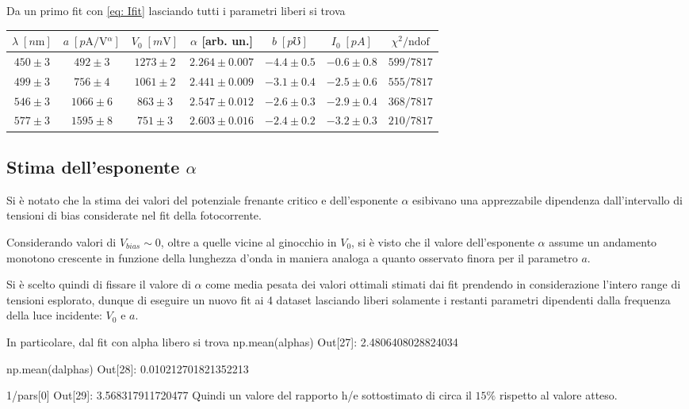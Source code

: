 \documentclass[10pt, a4paper, italian]{article}
\begin{document}
Da un primo fit con \cref{eq: Ifit} lasciando tutti i parametri liberi si
trova
\begin{table}
\centering
\begin{tabular}{ccccccc}
\toprule
$\lambda \; [\si{n\m}]$ & $a \; [\si{p\A/\V^\alpha}] $ & $V_0 \; [\si{m\V}]$ &
$\alpha$ [arb. un.] & $b \; [\si{p\mho}]$ & $I_0 \; [\si{pA}]$ & $\chi^2/\text{ndof}$ \\
\midrule
$450 \pm 3$ & $492 \pm 3$ & $1273 \pm 2$ & $2.264 \pm 0.007$ & $-4.4 \pm 0.5$ &
$-0.6 \pm 0.8$ & $599/7817$ \\
$499 \pm 3$ & $756 \pm 4$ & $1061 \pm 2$ & $2.441 \pm 0.009$ & $-3.1 \pm 0.4$ &
$-2.5 \pm 0.6$ & $555/7817$ \\
$546 \pm 3$ & $1066 \pm 6$ & $863 \pm 3$ & $2.547 \pm 0.012$ & $-2.6 \pm 0.3$ &
$-2.9 \pm 0.4$ & $368/7817$ \\
$577 \pm 3$ & $1595 \pm 8$ & $751 \pm 3$ & $2.603 \pm 0.016$ & $-2.4 \pm 0.2$ &
$-3.2 \pm 0.3$ & $210/7817$ \\
\bottomrule
\end{tabular}
\end{table}

\subsection{Stima dell'esponente $\alpha$}
Si è notato che la stima dei valori del potenziale frenante critico e
dell'esponente $\alpha$ esibivano una apprezzabile dipendenza dall'intervallo
di tensioni di bias considerate nel fit della fotocorrente.

Considerando valori di $V_{bias} \sim 0$, oltre
a quelle vicine al ginocchio in $V_{0}$, si è visto che il valore
dell'esponente $\alpha$ assume un andamento monotono crescente in funzione
della lunghezza d'onda in maniera analoga a quanto osservato finora per il
parametro $a$.

Si è scelto quindi di fissare il valore di $\alpha$ come media pesata dei
valori ottimali stimati dai fit prendendo in considerazione l'intero range di
tensioni esplorato, dunque di eseguire un nuovo fit ai 4 dataset lasciando
liberi solamente i restanti parametri dipendenti dalla frequenza della luce
incidente: $V_{0}$ e $a$.

In particolare, dal fit con alpha libero si trova
np.mean(alphas)
Out[27]: 2.4806408028824034

np.mean(dalphas)
Out[28]: 0.010212701821352213

1/pars[0]
Out[29]: 3.568317911720477
Quindi un valore del rapporto h/e sottostimato di circa il $15 \%$ rispetto al
valore atteso.
\end{document}
